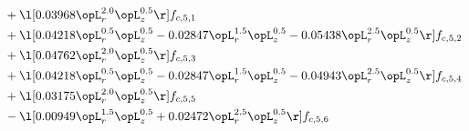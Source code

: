 \begin{alignat}{2}
& + \l[  0.03968 \opL_r^{2.0} \opL_z^{0.5}  \r] f_{c,5,1} \nonumber \\ 
& + \l[  0.04218 \opL_r^{0.5} \opL_z^{0.5}   -0.02847 \opL_r^{1.5} \opL_z^{0.5}   -0.05438 \opL_r^{2.5} \opL_z^{0.5}  \r] f_{c,5,2} \nonumber \\ 
& + \l[  0.04762 \opL_r^{2.0} \opL_z^{0.5}  \r] f_{c,5,3} \nonumber \\ 
& + \l[  0.04218 \opL_r^{0.5} \opL_z^{0.5}   -0.02847 \opL_r^{1.5} \opL_z^{0.5}   -0.04943 \opL_r^{2.5} \opL_z^{0.5}  \r] f_{c,5,4} \nonumber \\ 
& + \l[  0.03175 \opL_r^{2.0} \opL_z^{0.5}  \r] f_{c,5,5} \nonumber \\ 
& - \l[  0.00949 \opL_r^{1.5} \opL_z^{0.5} +  0.02472 \opL_r^{2.5} \opL_z^{0.5}  \r] f_{c,5,6} \nonumber \\ 
\end{alignat} 



